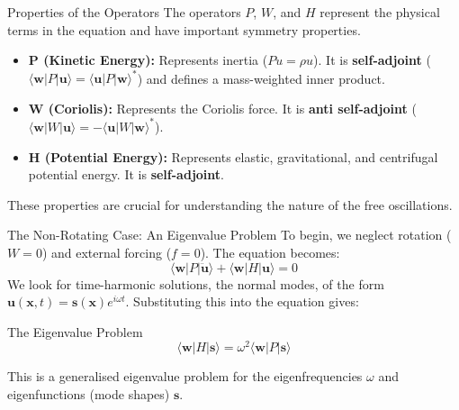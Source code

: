 \documentclass{beamer}
\begin{document}
\begin{frame}{Properties of the Operators}
    The operators $P$, $W$, and $H$ represent the physical terms in the equation and have important symmetry properties.
    \begin{itemize}
        \item \textbf{P (Kinetic Energy):} Represents inertia ($Pu = \rho u$). It is \textbf{self-adjoint} ($\langle \mathbf{w}|P|\mathbf{u}\rangle = \langle \mathbf{u}|P|\mathbf{w}\rangle^{*}$) and defines a mass-weighted inner product.
        \pause
        \item \textbf{W (Coriolis):} Represents the Coriolis force. It is \textbf{anti self-adjoint} ($\langle \mathbf{w}|W|\mathbf{u}\rangle = -\langle \mathbf{u}|W|\mathbf{w}\rangle^{*}$).
        \pause
        \item \textbf{H (Potential Energy):} Represents elastic, gravitational, and centrifugal potential energy. It is \textbf{self-adjoint}.
    \end{itemize}
    These properties are crucial for understanding the nature of the free oscillations.
\end{frame}


\begin{frame}{The Non-Rotating Case: An Eigenvalue Problem}
    To begin, we neglect rotation ($W=0$) and external forcing ($f=0$). The equation becomes:
    $$ \langle \mathbf{w}|P|\ddot{\mathbf{u}}\rangle + \langle \mathbf{w}|H|\mathbf{u}\rangle = 0 $$
    \pause
    We look for time-harmonic solutions, the normal modes, of the form $\mathbf{u}(\mathbf{x},t) = \mathbf{s}(\mathbf{x})e^{i\omega t}$.
    \pause
    Substituting this into the equation gives:
    \begin{alertblock}{The Eigenvalue Problem}
        $$ \langle \mathbf{w}|H|\mathbf{s}\rangle = \omega^2 \langle \mathbf{w}|P|\mathbf{s}\rangle $$
    \end{alertblock}
    \pause
    This is a generalised eigenvalue problem for the eigenfrequencies $\omega$ and eigenfunctions (mode shapes) $\mathbf{s}$.
\end{frame}
\end{document}
